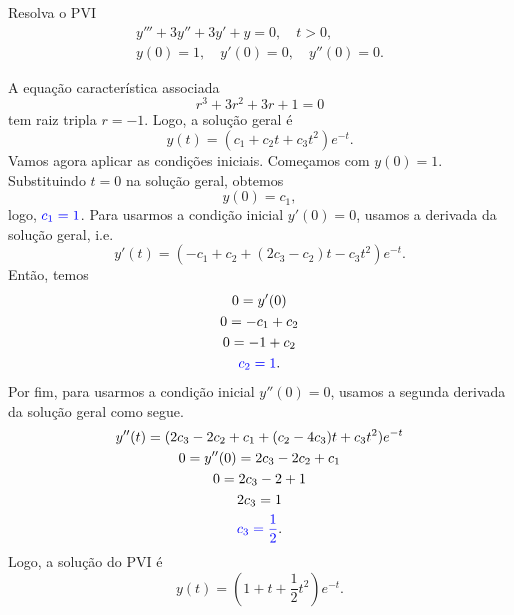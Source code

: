 \begin{exeresol}\label{exeresol:edolin_on_h}
  Resolva o PVI
  \begin{align}
    y''' + 3y'' + 3y' + y = 0,\quad t>0,\\
    y(0)=1,\quad y'(0)=0,\quad y''(0)=0.
  \end{align}
\end{exeresol}
\begin{resol}
  A equação característica associada
  \begin{equation}
    r^3 + 3r^2 + 3r + 1 = 0
  \end{equation}
  tem raiz tripla $r=-1$. Logo, a solução geral é
  \begin{equation}
    y(t) = (c_1 + c_2t + c_3t^2)e^{-t}.
  \end{equation}
  Vamos agora aplicar as condições iniciais. Começamos com $y(0)=1$. Substituindo $t=0$ na solução geral, obtemos
  \begin{equation}
    y(0) = c_1,
  \end{equation}
  logo, ${\color{blue}c_1 = 1}$. Para usarmos a condição inicial $y'(0)=0$, usamos a derivada da solução geral, i.e.
  \begin{equation}
    y'(t) = (-c_1 + c_2 + (2c_3-c_2)t - c_3t^2)e^{-t}.
  \end{equation}
  Então, temos
  \begin{gather}
    0 = y'(0) \\
    0  = -c_1 + c_2 \\
    0  = -1 + c_2 \\
    {\color{blue}c_2 = 1}.
  \end{gather}
  Por fim, para usarmos a condição inicial $y''(0)=0$, usamos a segunda derivada da solução geral como segue.
  \begin{gather}
    y''(t) = (2c_3-2c_2+c_1 + (c_2 - 4c_3)t + c_3t^2)e^{-t}\\
    0=y''(0)=2c_3-2c_2+c_1\\
    0=2c_3-2+1\\
    2c_3=1\\
    {\color{blue}c_3=\frac{1}{2}}.
  \end{gather}
  Logo, a solução do PVI é
  \begin{equation}
    y(t) = \left(1 + t + \frac{1}{2}t^2\right)e^{-t}.
  \end{equation}
\end{resol}

